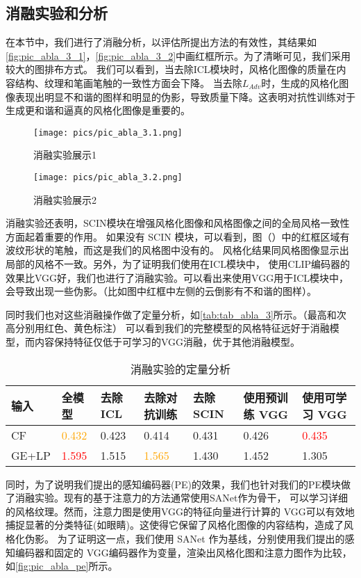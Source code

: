 \subsection{消融实验和分析}
在本节中，我们进行了消融分析，以评估所提出方法的有效性，其结果如\autoref{fig:pic_abla_3_1}，\autoref{fig:pic_abla_3_2}中画红框所示。为了清晰可见，我们采用较大的图排布方式。
我们可以看到，当去除ICL模块时，风格化图像的质量在内容结构、纹理和笔画笔触的一致性方面会下降。
当去除$L_{Adv}$时，生成的风格化图像表现出明显不和谐的图样和明显的伪影，导致质量下降。这表明对抗性训练对于生成更和谐和逼真的风格化图像是重要的。

\begin{figure}[htbp]
    \centering
    \texttt{[image: pics/pic\_abla\_3.1.png]}
    \caption{\label{fig:pic_abla_3_1}消融实验展示1}
\end{figure}
\begin{figure}[htbp]
    \centering
    \texttt{[image: pics/pic\_abla\_3.2.png]}
    \caption{\label{fig:pic_abla_3_2}消融实验展示2}
\end{figure}
消融实验还表明，SCIN模块在增强风格化图像和风格图像之间的全局风格一致性方面起着重要的作用。
如果没有 SCIN 模块，可以看到，图（）中的红框区域有波纹形状的笔触，而这是我们的风格图中没有的。
风格化结果同风格图像显示出局部的风格不一致。另外，为了证明我们使用在ICL模块中，
使用CLIP编码器的效果比VGG好，我们也进行了消融实验。可以看出来使用VGG用于ICL模块中，会导致出现一些伪影。（比如图中红框中左侧的云倒影有不和谐的图样）。
\par 同时我们也对这些消融操作做了定量分析，如\autoref{tab:tab_abla_3}所示。（最高和次高分别用红色、黄色标注）
可以看到我们的完整模型的风格特征远好于消融模型，而内容保持特征仅低于可学习的VGG消融，优于其他消融模型。

\begin{table}[htbp]
    \caption{\label{tab:tab_abla_3}消融实验的定量分析}
    \begin{tabularx}{\linewidth}{X<{\centering}|X<{\centering}|X<{\centering}|X<{\centering}|X<{\centering}|X<{\centering}|X<{\centering}}
        \hline
        输入   & 全模型 & 去除 ICL & 去除对抗训练 & 去除 SCIN & 使用预训练 VGG & 使用可学习 VGG \\ \hline

        CF    & \textcolor{orange}{0.432}  & 0.423 & 0.414 & 0.431 & 0.426 & \textcolor{red}{0.435}  \\
        GE+LP & \textcolor{red}{1.595} & 1.515 & \textcolor{orange}{1.565} & 1.430 & 1.452 & 1.305 \\ \hline

    \end{tabularx}
\end{table}
\par 同时，为了说明我们提出的感知编码器(PE)的效果，我们也针对我们的PE模块做了消融实验。现有的基于注意力的方法通常使用SANet作为骨干，
可以学习详细的风格纹理。然而，注意力图是使用VGG的特征向量进行计算的
VGG可以有效地捕捉显著的分类特征(如眼睛)。这使得它保留了风格化图像的内容结构，造成了风格化伪影。
为了证明这一点，我们使用 SANet 作为基线，分别使用我们提出的感知编码器和固定的 VGG编码器作为变量，渲染出风格化图和注意力图作为比较，如\autoref{fig:pic_abla_pe}所示。

